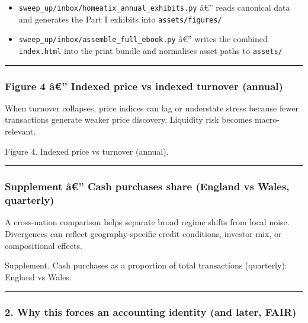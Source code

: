 \begin{itemize}
\tightlist
\item
  \texttt{sweep\_up/inbox/homeatix\_annual\_exhibits.py} â€'' reads
  canonical data and generates the Part I exhibits into
  \texttt{assets/figures/}
\item
  \texttt{sweep\_up/inbox/assemble\_full\_ebook.py} â€'' writes the
  combined \texttt{index.html} into the print bundle and normalises
  asset paths to \texttt{assets/}
\end{itemize}

\begin{center}\rule{0.5\linewidth}{0.5pt}\end{center}

\protect{}\label{part1-fig4}
\subsubsection{Figure 4 â€'' Indexed price vs indexed turnover
(annual)}\label{figure-4-uxe2-indexed-price-vs-indexed-turnover-annual}

When turnover collapses, price indices can lag or understate stress
because fewer transactions generate weaker price discovery. Liquidity
risk becomes macro-relevant.

Figure 4. Indexed price vs turnover (annual).

\begin{center}\rule{0.5\linewidth}{0.5pt}\end{center}

\protect{}\label{part1-cashshare-ew}
\subsubsection{Supplement â€'' Cash purchases share (England vs Wales,
quarterly)}\label{supplement-uxe2-cash-purchases-share-england-vs-wales-quarterly}

A cross-nation comparison helps separate broad regime shifts from local
noise. Divergences can reflect geography-specific credit conditions,
investor mix, or compositional effects.

Supplement. Cash purchases as a proportion of total transactions
(quarterly): England vs Wales.

\begin{center}\rule{0.5\linewidth}{0.5pt}\end{center}

\protect{}\label{part1-bridge-to-identity}
\subsubsection{2. Why this forces an accounting identity (and later,
FAIR)}\label{why-this-forces-an-accounting-identity-and-later-fair}

